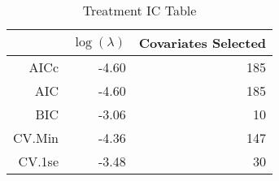 \begin{table}[ht]
\centering
\begin{tabular}{rrr}
  \hline
 & $\log(\lambda)$ & Covariates Selected \\ 
  \hline
AICc & -4.60 & 185 \\ 
  AIC & -4.60 & 185 \\ 
  BIC & -3.06 &  10 \\ 
  CV.Min & -4.36 & 147 \\ 
  CV.1se & -3.48 &  30 \\ 
   \hline
\end{tabular}
\caption{Treatment IC Table} 
\label{tab:treat_ic}
\end{table}
